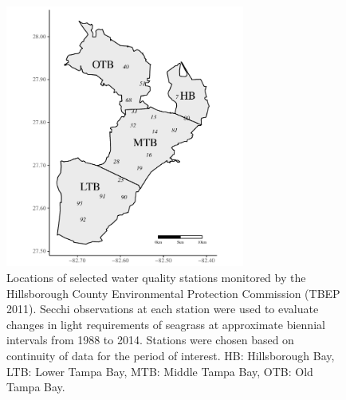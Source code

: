 \documentclass[letterpaper,12pt,oneside]{article}\usepackage[]{graphicx}\usepackage[]{color}
\begin{document}
\begin{figure}
\centering
\includegraphics[width = 0.7\textwidth]{figs/FigS1.pdf}
\caption{Locations of selected water quality stations monitored by the Hillsborough County Environmental Protection Commission (TBEP 2011).  Secchi observations at each station were used to evaluate changes in light requirements of seagrass at approximate biennial intervals from 1988 to 2014. Stations were chosen based on continuity of data for the period of interest.  HB: Hillsborough Bay, LTB: Lower Tampa Bay, MTB: Middle Tampa Bay, OTB: Old Tampa Bay.}
\label{fig:tb_ts_locs}
\end{figure}

\end{document}
